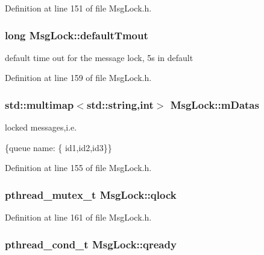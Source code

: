 \-Definition at line 151 of file \-Msg\-Lock.\-h.

\hypertarget{classMsgLock_a39cad315b694113c3aa552ba84db9093}{
\subsubsection[{default\-Tmout}]{\setlength{\rightskip}{0pt plus 5cm}long {\bf \-Msg\-Lock\-::default\-Tmout}}}\label{da/d01/classMsgLock_a39cad315b694113c3aa552ba84db9093}


default time out for the message lock, 5s in default 



\-Definition at line 159 of file \-Msg\-Lock.\-h.

\hypertarget{classMsgLock_a15c1b0e57d86b2598e5b57b43094c4c6}{
\subsubsection[{m\-Datas}]{\setlength{\rightskip}{0pt plus 5cm}std\-::multimap$<$std\-::string,int$>$ {\bf \-Msg\-Lock\-::m\-Datas}}}\label{da/d01/classMsgLock_a15c1b0e57d86b2598e5b57b43094c4c6}


locked messages,i.\-e. 

\{queue name\-: \{ id1,id2,id3\}\} 

\-Definition at line 155 of file \-Msg\-Lock.\-h.

\hypertarget{classMsgLock_a8d00c3f7af52fef41cc98c661e1df541}{
\subsubsection[{qlock}]{\setlength{\rightskip}{0pt plus 5cm}pthread\-\_\-mutex\-\_\-t {\bf \-Msg\-Lock\-::qlock}}}\label{da/d01/classMsgLock_a8d00c3f7af52fef41cc98c661e1df541}


\-Definition at line 161 of file \-Msg\-Lock.\-h.

\hypertarget{classMsgLock_a94499ef81482492775a556e26ff6fe3f}{
\subsubsection[{qready}]{\setlength{\rightskip}{0pt plus 5cm}pthread\-\_\-cond\-\_\-t {\bf \-Msg\-Lock\-::qready}}}\label{da/d01/classMsgLock_a94499ef81482492775a556e26ff6fe3f}



